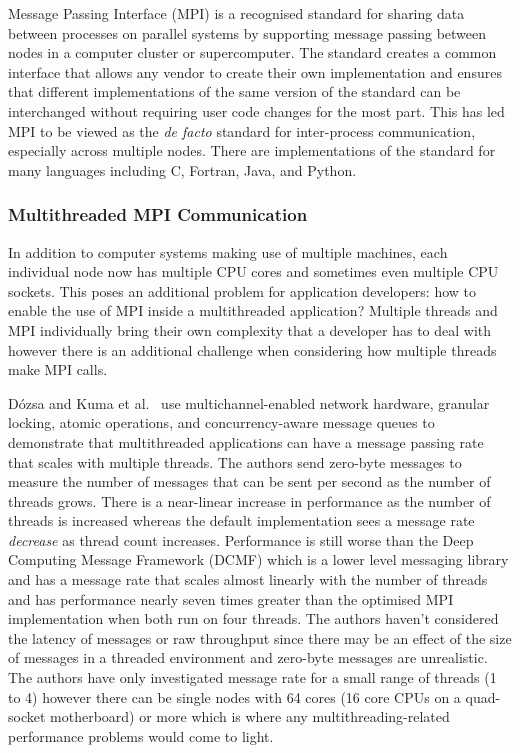 
Message Passing Interface (MPI) is a recognised standard for sharing data
between processes on parallel systems by supporting message passing between
nodes in a computer cluster or supercomputer. The standard creates a common
interface that allows any vendor to create their own implementation and ensures
that different implementations of the same version of the standard can be
interchanged without requiring user code changes for the most part. This has led
MPI to be viewed as the \textit{de facto} standard for inter-process
communication, especially across multiple nodes. There are implementations of
the standard for many languages including C, Fortran, Java, and Python.

\subsubsection{Multithreaded MPI Communication}

In addition to computer systems making use of multiple machines, each individual
node now has multiple CPU cores and sometimes even multiple CPU sockets. This
poses an additional problem for application developers: how to enable the use of
MPI inside a multithreaded application? Multiple threads and MPI individually
bring their own complexity that a developer has to deal with however there is an
additional challenge when considering how multiple threads make MPI calls.

D\'{o}zsa and Kuma et al.\ \cite{Kumar} use multichannel-enabled network
hardware, granular locking, atomic operations, and concurrency-aware message
queues to demonstrate that multithreaded applications can have a message passing
rate that scales with multiple threads. The authors send zero-byte messages to
measure the number of messages that can be sent per second as the number of
threads grows. There is a near-linear increase in performance as the number of
threads is increased whereas the default implementation sees a message rate
\textit{decrease} as thread count increases. Performance is still worse than the
Deep Computing Message Framework (DCMF) which is a lower level messaging library
and has a message rate that scales almost linearly with the number of threads
and has performance nearly seven times greater than the optimised MPI
implementation when both run on four threads. The authors haven't considered the
latency of messages or raw throughput since there may be an effect of the size
of messages in a threaded environment and zero-byte messages are unrealistic.
The authors have only investigated message rate for a small range of threads (1
to 4) however there can be single nodes with 64 cores (16 core CPUs on a
quad-socket motherboard) or more which is where any multithreading-related
performance problems would come to light.

